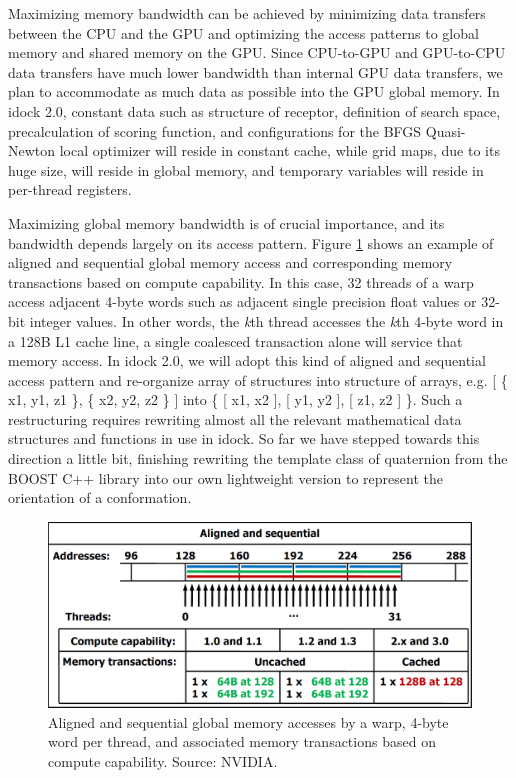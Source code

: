 Maximizing memory bandwidth can be achieved by minimizing data transfers between the CPU and the GPU and optimizing the access patterns to global memory and shared memory on the GPU. Since CPU-to-GPU and GPU-to-CPU data transfers have much lower bandwidth than internal GPU data transfers, we plan to accommodate as much data as possible into the GPU global memory. In idock 2.0, constant data such as structure of receptor, definition of search space, precalculation of scoring function, and configurations for the BFGS Quasi-Newton local optimizer will reside in constant cache, while grid maps, due to its huge size, will reside in global memory, and temporary variables will reside in per-thread registers.

Maximizing global memory bandwidth is of crucial importance, and its bandwidth depends largely on its access pattern. Figure \ref{GPU:AlignedSequentialGlobalMemoryAccess} shows an example of aligned and sequential global memory access and corresponding memory transactions based on compute capability. In this case, 32 threads of a warp access adjacent 4-byte words such as adjacent single precision float values or 32-bit integer values. In other words, the \textit{k}th thread accesses the \textit{k}th 4-byte word in a 128B L1 cache line, a single coalesced transaction alone will service that memory access. In idock 2.0, we will adopt this kind of aligned and sequential access pattern and re-organize array of structures into structure of arrays, e.g.  [ \{ x1, y1, z1 \}, \{ x2, y2, z2 \} ] into \{ [ x1, x2 ], [ y1, y2 ], [ z1, z2 ] \}. Such a restructuring requires rewriting almost all the relevant mathematical data structures and functions in use in idock. So far we have stepped towards this direction a little bit, finishing rewriting the template class of quaternion from the BOOST C++ library into our own lightweight version to represent the orientation of a conformation.

\begin{figure}
\centering
\includegraphics[width=\linewidth]{GPU/AlignedSequentialGlobalMemoryAccess.png}
\caption{Aligned and sequential global memory accesses by a warp, 4-byte word per thread, and associated memory transactions based on compute capability. Source: NVIDIA.}
\label{GPU:AlignedSequentialGlobalMemoryAccess}
\end{figure}

